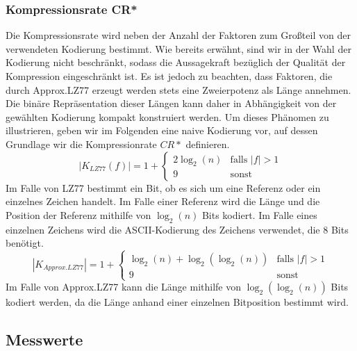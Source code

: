 \subsubsection{Kompressionsrate CR*} \label{cr}
Die Kompressionsrate wird neben der Anzahl der Faktoren zum Großteil von der verwendeten Kodierung bestimmt. Wie bereits erwähnt, sind wir in der Wahl der Kodierung
nicht beschränkt, sodass die Aussagekraft bezüglich der Qualität der Kompression eingeschränkt ist. Es ist jedoch zu beachten, dass Faktoren, die durch Approx.LZ77
erzeugt werden stets eine Zweierpotenz als Länge annehmen. Die binäre Repräsentation dieser Längen kann daher in Abhängigkeit von der gewählten Kodierung kompakt 
konstruiert werden. Um dieses Phänomen zu illustrieren, geben wir im Folgenden eine naive Kodierung vor, auf dessen Grundlage wir die Kompressionrate $CR*$ definieren.
\begin{equation}
    |K_{LZ77}(f)| = 1 + \begin{cases}
        2\log_2(n) & \text{falls } |f| > 1 \\
        9 & \text{sonst}
    \end{cases}
\end{equation}
Im Falle von LZ77 bestimmt ein Bit, ob es sich um eine Referenz oder ein einzelnes Zeichen handelt. Im Falle einer Referenz wird die Länge und die Position der Referenz
mithilfe von $\log_2(n)$ Bits kodiert. Im Falle eines einzelnen Zeichens wird die ASCII-Kodierung des Zeichens verwendet, die 8 Bits benötigt.
\begin{equation}
    |K_{Approx.LZ77}|= 1 + \begin{cases}
        \log_2(n)+\log_2(\log_2(n)) & \text{falls } |f| > 1 \\
        9 & \text{sonst}
    \end{cases}
\end{equation}
Im Falle von Approx.LZ77 kann die Länge mithilfe von $\log_2(\log_2(n))$ Bits kodiert werden, da die Länge anhand einer einzelnen Bitposition bestimmt wird.

\newpage
\subsection{Messwerte}

